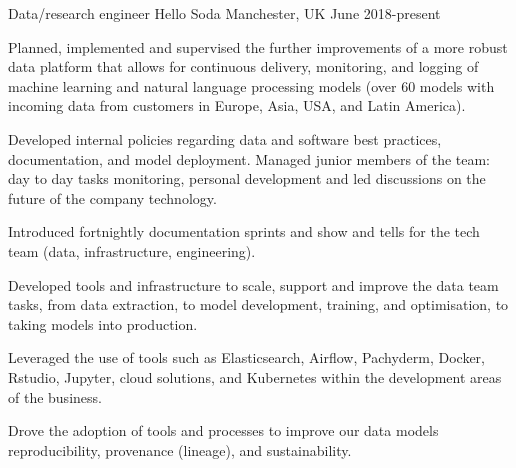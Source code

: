 


\begin{cventries}




\cventry
{Data/research engineer} %
{Hello Soda } %
{Manchester, UK} %
{June 2018-present } %
{ %
\begin{cvitems}
\item {Planned, implemented and supervised the further improvements of a more robust data platform that allows for continuous delivery, monitoring, and logging of machine learning and natural language processing models (over 60 models with incoming data from customers in Europe, Asia, USA, and Latin America).}
\item{Developed internal policies regarding data and software best practices, documentation, and model deployment. Managed junior members of the team: day to day tasks monitoring, personal development and led discussions on the future of the company technology.}
\item{Introduced fortnightly documentation sprints and show and tells for the tech team (data, infrastructure, engineering).} 
\item{Developed tools and infrastructure to scale, support and improve the data team tasks, from data extraction, to model development, training, and optimisation, to taking models into production.}
\item{Leveraged the use of tools such as Elasticsearch, Airflow, Pachyderm, Docker, Rstudio, Jupyter, cloud solutions, and Kubernetes within the development areas of the business.}
\item{Drove the adoption of tools and processes to improve our data models reproducibility, provenance (lineage), and sustainability.}
\end{cvitems}
}



\end{cventries}
